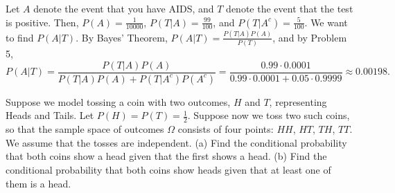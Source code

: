 \begin{solution}
  Let $A$ denote the event that you have AIDS, and $T$ denote the event that the test is positive. Then, $P(A) = \frac{1}{10000}$, $P(T | A) = \frac{99}{100}$, and $P(T | A^c) = \frac{5}{100}$. We want to find $P(A | T)$. By Bayes' Theorem, $P(A | T) = \frac{P(T | A) P(A)}{P(T)}$, and by Problem 5,
  \[ P(A | T) = \frac{P(T | A) P(A)}{P(T | A) P(A) + P(T | A^c) P(A^c)} = \frac{0.99 \cdot 0.0001}{0.99 \cdot 0.0001 + 0.05 \cdot 0.9999} \approx 0.00198. \]
\end{solution}


\begin{problem}
  Suppose we model tossing a coin with two outcomes, $H$ and $T$, representing Heads and Tails. Let $P(H) = P(T) = \frac{1}{2}$. Suppose now we toss two such coins, so that the sample space of outcomes $\Omega$ consists of four points: $HH$, $HT$, $TH$, $TT$. We assume that the tosses are independent. 
  (a) Find the conditional probability that both coins show a head given that the first shows a head.
  (b) Find the conditional probability that both coins show heads given that at least one of them is a head.
\end{problem}

\begin{solution}
\end{solution}
